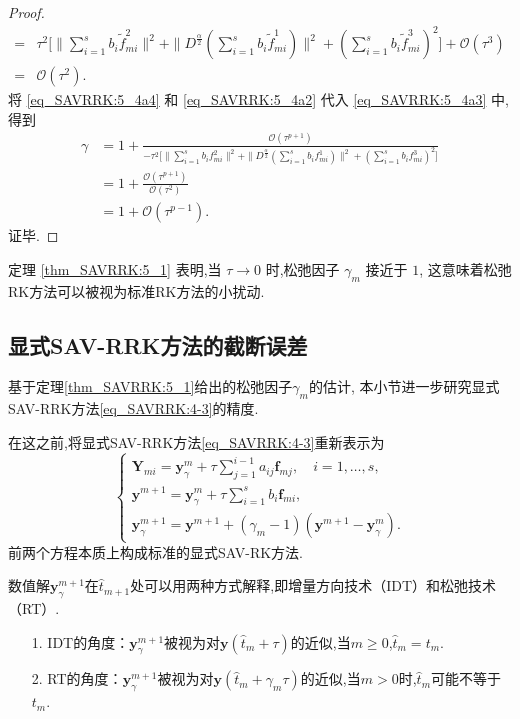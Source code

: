\begin{proof}
\begin{align}
	=&\tau^2\Big[\|\sum\limits_{i=1}^{s}b_i\tilde{f}_{mi}^2\|^2+ \|D^\frac{\alpha}{2}(\sum\limits_{i=1}^{s}b_i\tilde{f}_{mi}^1)\|^2+(\sum\limits_{i=1}^{s}b_i\tilde{f}_{mi}^3)^2\Big]+\mathcal{O}(\tau^3)\nonumber\\
	=&\mathcal{O}(\tau^2).
\end{align}
将 \eqref{eq_SAVRRK:5_4a4} 和 \eqref{eq_SAVRRK:5_4a2} 代入 \eqref{eq_SAVRRK:5_4a3} 中,得到
\begin{align}\label{eq_SAVRRK:5_4a5}
	\gamma&=1+\frac{\mathcal{O}(\tau^{p+1})}{-\tau^2\Big[\|\sum\limits_{i=1}^{s}b_if_{mi}^2\|^2+ \|D^\frac{\alpha}{2}(\sum\limits_{i=1}^{s}b_if_{mi}^1)\|^2+(\sum\limits_{i=1}^{s}b_if_{mi}^3)^2\Big]}\nonumber\\
	&=1+\frac{\mathcal{O}(\tau^{p+1})}{\mathcal{O}(\tau^2)}\nonumber\\
	&=1+\mathcal{O}(\tau^{p-1}).
\end{align}
证毕.
\end{proof}

\begin{remark}\label{rk_SAVRRK:5_1}
定理 \ref{thm_SAVRRK:5_1} 表明,当 $\tau\rightarrow 0$ 时,松弛因子 $\gamma_m$ 接近于 $1$,
这意味着松弛RK方法可以被视为标准RK方法的小扰动.
\end{remark}

\subsection{显式SAV-RRK方法的截断误差}
基于定理\ref{thm_SAVRRK:5_1}给出的松弛因子$\gamma_m$的估计, 本小节进一步研究显式SAV-RRK方法\eqref{eq_SAVRRK:4-3}的精度.

在这之前,将显式SAV-RRK方法\eqref{eq_SAVRRK:4-3}重新表示为
\begin{equation}
\left\{\begin{array}{l}
\bm{Y}_{m i}=\bm{y}_\gamma^m+\tau \sum\limits_{j=1}^{i-1} a_{i j} \bm{f}_{m j}, \quad i=1, \ldots, s, \\
\bm{y}^{m+1}=\bm{y}_\gamma^m+\tau \sum\limits_{i=1}^s b_i \bm{f}_{m i},\\
\bm{y}_\gamma^{m+1}=\bm{y}^{m+1}+\left(\gamma_m-1\right)\left(\bm{y}^{m+1}-\bm{y}_\gamma^m\right) .
\end{array}\right.\label{eq_SAVRRK:4-321}
\end{equation}
前两个方程本质上构成标准的显式SAV-RK方法.

数值解$\bm{y}_\gamma^{m+1}$在$\hat{t}_{m+1}$处可以用两种方式解释\cite{ketchesonRelaxationRungeKutta2019},即增量方向技术（IDT）和松弛技术（RT）.
\begin{itemize}
\item[1.] IDT的角度：$\bm{y}_\gamma^{m+1}$被视为对$\bm{y}\left(\hat{t}_m+\tau\right)$的近似,当$m \geq 0$,$\hat{t}_m=t_m$.
\item[2.] RT的角度：$\bm{y}_\gamma^{m+1}$被视为对$\bm{y}\left(\hat{t}_m+\gamma_m \tau\right)$的近似,当$m>0$时,$\hat{t}_m$可能不等于$t_m$.
\end{itemize}

